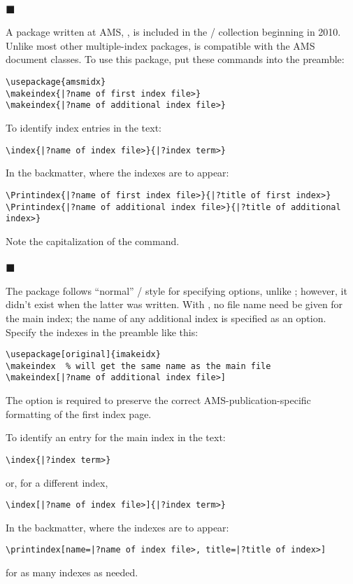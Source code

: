 \subsubsection*{{\tiny$\blacksquare$} }

A package written at AMS, , is included in the
\amslatex/ collection beginning in 2010.  Unlike most other
multiple-index packages,  is compatible with the AMS
document classes.  To use this package, put these commands into the
preamble:
\begin{verbatim}
\usepackage{amsmidx}
\makeindex{|?name of first index file>}
\makeindex{|?name of additional index file>}
\end{verbatim}

To identify index entries in the text:
\begin{verbatim}
\index{|?name of index file>}{|?index term>}
\end{verbatim}
In the backmatter, where the indexes are to appear:
\begin{verbatim}
\Printindex{|?name of first index file>}{|?title of first index>}
\Printindex{|?name of additional index file>}{|?title of additional index>}
\end{verbatim}
Note the capitalization of the  command.

\subsubsection*{{\tiny$\blacksquare$} }

The package  follows ``normal'' \latex/ style
for specifying options, unlike ; however,
it didn't exist when the latter was written.  With ,
no file name need be given for the main index; the name of any
additional index is specified as an option.  Specify the indexes
in the preamble like this:
\begin{verbatim}
\usepackage[original]{imakeidx}
\makeindex  % will get the same name as the main file
\makeindex[|?name of additional index file>]
\end{verbatim}
The  option is required to preserve the correct
AMS-publication-specific formatting of the first index page.

To identify an entry for the main index in the text:
\begin{verbatim}
\index{|?index term>}
\end{verbatim}
or, for a different index,
\begin{verbatim}
\index[|?name of index file>]{|?index term>}
\end{verbatim}
\goodbreak
In the backmatter, where the indexes are to appear:
\begin{verbatim}
\printindex[name=|?name of index file>, title=|?title of index>]
\end{verbatim}
for as many indexes as needed.

